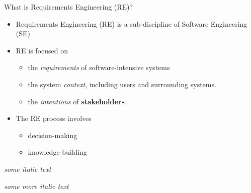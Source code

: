 
\begin{Slide}{What is Requirements Engineering (RE)?}

\begin{itemize}
\item Requirements Engineering (RE) is a sub-discipline of Software Engineering (SE) 

\item RE is focused on 
\begin{itemize}
\item the \textit{requirements} of software-intensive systems 
\item the system \textit{context}, including users and surrounding systems.
\item the \textit{intentions} of \textbf{stakeholders}

\end{itemize}
\item The RE process involves 
\begin{itemize}
\item decision-making
\item knowledge-building

\end{itemize}
\end{itemize}
\textit{some italic text}


\textit{some more italic text}


\end{Slide}
